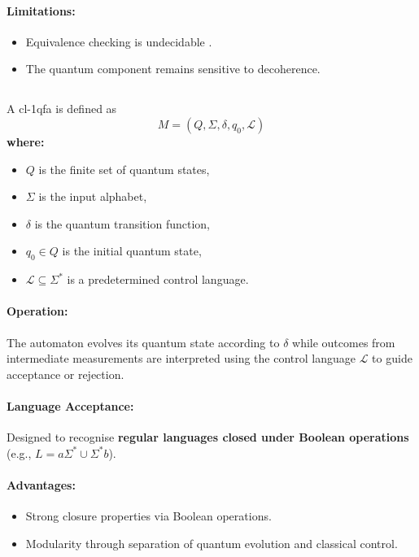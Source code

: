 \paragraph{Limitations:}
\begin{itemize}
    \item Equivalence checking is undecidable \cite{hirvensalo2008}.
    \item The quantum component remains sensitive to decoherence.
\end{itemize}
\cite{qiu2009}

\subsection{}
\label{subsec:cl-1qfa}
\begin{definition}
A \gls{cl-1qfa} is defined as 
\[
M = (Q, \Sigma, \delta, q_0, \mathcal{L})
\]
\textbf{where:}
\begin{itemize}
    \item \( Q \) is the finite set of quantum states,
    \item \( \Sigma \) is the input alphabet,
    \item \( \delta \) is the quantum transition function,
    \item \( q_0 \in Q \) is the initial quantum state,
    \item \( \mathcal{L} \subseteq \Sigma^* \) is a predetermined control language.
\end{itemize}
\end{definition}

\paragraph{Operation:}  
The automaton evolves its quantum state according to \( \delta \) while outcomes from intermediate measurements are interpreted using the control language \( \mathcal{L} \) to guide acceptance or rejection.

\paragraph{Language Acceptance:}  
Designed to recognise \textbf{regular languages closed under Boolean operations} (e.g., \( L = a\Sigma^* \cup \Sigma^* b \)).

\paragraph{Advantages:}
\begin{itemize}
    \item Strong closure properties via Boolean operations.
    \item Modularity through separation of quantum evolution and classical control.
\end{itemize}

